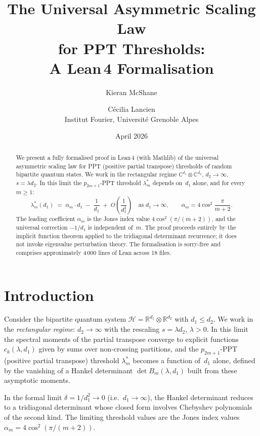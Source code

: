 \documentclass[11pt,a4paper]{article}
\title{%
  The Universal Asymmetric Scaling Law\\
  for PPT Thresholds:\\[4pt]
  \large A Lean\,4 Formalisation}
\author{%
  Kieran McShane \and C\'ecilia Lancien\\[2pt]
  \small Institut Fourier, Universit\'e Grenoble Alpes}
\date{April 2026}
\theoremstyle{plain}
\theoremstyle{definition}
\newcommand{\R}{\mathbb{R}}
\newcommand{\alpham}{\alpha_m}
\begin{document}
\maketitle

\begin{abstract}
We present a fully formalised proof in Lean\,4 (with Mathlib) of
the universal asymmetric scaling law for PPT (positive partial
transpose) thresholds of random bipartite quantum states.
We work in the rectangular regime
$\mathbb{C}^{d_1} \otimes \mathbb{C}^{d_2}$,
$d_2 \to \infty$, $s = \lambda d_2$.
In this limit the $p_{2m+1}$-PPT threshold $\lambda^*_m$
depends on~$d_1$ alone, and for every $m \ge 1$:
\[
  \lambda^*_m(d_1) \;=\; \alpham \cdot d_1 \;-\; \frac{1}{d_1}
  \;+\; O\!\left(\frac{1}{d_1^3}\right)
  \quad\text{as } d_1 \to \infty,
  \qquad \alpham = 4\cos^2\!\frac{\pi}{m+2}.
\]
The leading coefficient $\alpham$ is the Jones index value
$4\cos^2(\pi/(m{+}2))$, and the universal correction $-1/d_1$
is independent of~$m$.
The proof proceeds entirely by the implicit function theorem
applied to the tridiagonal determinant recurrence; it does not
invoke eigenvalue perturbation theory.
The formalisation is sorry-free and comprises approximately 4\,000
lines of Lean across 18 files.
\end{abstract}

\tableofcontents

\section{Introduction}
\label{sec:intro}

Consider the bipartite quantum system $\mathcal{H} = \R^{d_1}
\otimes \R^{d_2}$ with $d_1 \le d_2$.  We work in the
\emph{rectangular regime}: $d_2 \to \infty$ with the rescaling
$s = \lambda d_2$, $\lambda > 0$.  In this limit the spectral
moments of the partial transpose converge to explicit functions
$c_k(\lambda, d_1)$ given by sums over non-crossing partitions,
and the $p_{2m+1}$-PPT (positive partial transpose) threshold
$\lambda^*_m$ becomes a function of~$d_1$ alone, defined by the
vanishing of a Hankel determinant $\det B_m(\lambda, d_1)$ built
from these asymptotic moments.

In the formal limit $\delta = 1/d_1^2 \to 0$ (i.e.\ $d_1 \to \infty$),
the Hankel determinant reduces to a tridiagonal determinant whose
closed form involves Chebyshev polynomials of the second kind.
The limiting threshold values are the Jones index values
$\alpham = 4\cos^2(\pi/(m{+}2))$.
\end{document}
